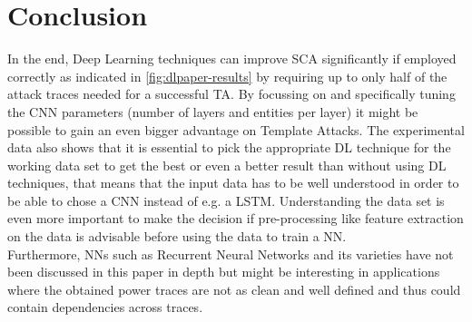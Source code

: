 \documentclass[journal]{IEEEtran}
\begin{document}
%


\section{Conclusion}
In the end, Deep Learning techniques can improve SCA significantly if employed correctly as indicated in \autoref{fig:dlpaper-results} by requiring up to only half of the attack traces needed for a successful TA. By focussing on and specifically tuning the CNN parameters (number of layers and entities per layer) it might be possible to gain an even bigger advantage on Template Attacks. The experimental data also shows that it is essential to pick the appropriate DL technique for the working data set to get the best or even a better result than without using DL techniques, that means that the input data has to be well understood in order to be able to chose a CNN instead of e.g. a LSTM. Understanding the data set is even more important to make the decision if pre-processing like feature extraction on the data is advisable before using the data to train a NN. \\
Furthermore, NNs such as Recurrent Neural Networks and its varieties have not been discussed in this paper in depth but might be interesting in applications where the obtained power traces are not as clean and well defined and thus could contain dependencies across traces. 
\end{document}
